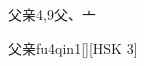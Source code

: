 \begin{entry}{父亲}{4,9}{⽗、⼇}
  \begin{phonetics}{父亲}{fu4qin1}[][HSK 3]
  \end{phonetics}
\end{entry}
